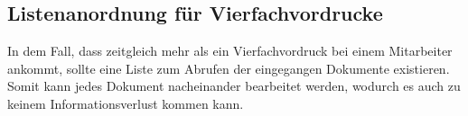 \subsection{Listenanordnung für Vierfachvordrucke}
In dem Fall, dass zeitgleich mehr als ein Vierfachvordruck bei einem Mitarbeiter ankommt, sollte eine Liste zum Abrufen der eingegangen Dokumente existieren. Somit kann jedes Dokument nacheinander bearbeitet werden, wodurch es auch zu keinem Informationsverlust kommen kann.